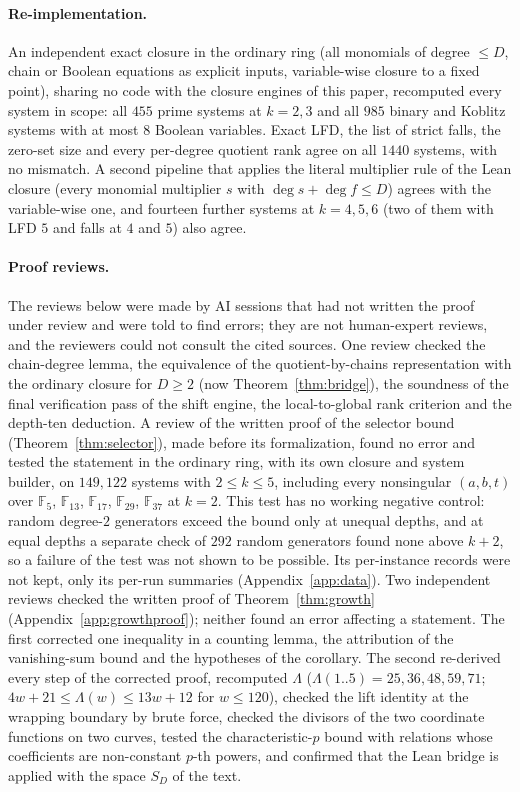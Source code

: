 \documentclass[11pt]{article}
\theoremstyle{definition}\newtheorem{definition}[theorem]{Definition}
\theoremstyle{remark}\newtheorem{remark}[theorem]{Remark}
\newcommand{\F}{\mathbb F}
\begin{document}
\paragraph{Re-implementation.} An independent exact closure in the
ordinary ring (all monomials of degree $\le D$, chain or Boolean equations
as explicit inputs, variable-wise closure to a fixed point), sharing no code
with the closure engines of this paper, recomputed every system in scope: all $455$ prime systems at $k=2,3$ and all $985$
binary and Koblitz systems with at most $8$ Boolean variables. Exact LFD,
the list of strict falls, the zero-set size and every per-degree quotient
rank agree on all $1440$ systems, with no mismatch. A second pipeline that
applies the literal multiplier rule of the Lean closure (every monomial
multiplier $s$ with $\deg s+\deg f\le D$) agrees with the variable-wise one,
and fourteen further systems at $k=4,5,6$ (two of them with LFD $5$ and
falls at $4$ and $5$) also agree.

\paragraph{Proof reviews.} The reviews below were made by AI sessions that
had not written the proof under review and were told to find errors; they are
not human-expert reviews, and the reviewers could not consult the cited
sources. One review checked the chain-degree lemma, the equivalence of the
quotient-by-chains representation with the ordinary closure for $D\ge2$ (now
Theorem~\ref{thm:bridge}), the soundness of the final verification pass of the
shift engine, the local-to-global rank criterion and the depth-ten deduction.
A review of the written proof of the selector bound
(Theorem~\ref{thm:selector}), made before its formalization, found no error
and tested the statement in the ordinary ring, with its own closure and system
builder, on $149{,}122$ systems with $2\le k\le5$, including every nonsingular
$(a,b,t)$ over $\F_5$, $\F_{13}$, $\F_{17}$, $\F_{29}$, $\F_{37}$ at $k=2$.
This test has no working negative control: random degree-$2$ generators exceed
the bound only at unequal depths, and at equal depths a separate check of
$292$ random generators found none above $k+2$, so a failure of the test was
not shown to be possible. Its per-instance records were not kept, only its
per-run summaries (Appendix~\ref{app:data}). Two independent reviews checked
the written proof of Theorem~\ref{thm:growth}
(Appendix~\ref{app:growthproof}); neither found an error affecting a
statement. The first corrected one inequality in a counting lemma, the
attribution of the vanishing-sum bound and the hypotheses of the corollary.
The second re-derived every step of the corrected proof,
recomputed $\Lambda$ ($\Lambda(1..5)=25,36,48,59,71$; $4w+21\le
\Lambda(w)\le13w+12$ for $w\le120$), checked the lift identity at the
wrapping boundary by brute force, checked the divisors of the two
coordinate functions on two curves, tested the characteristic-$p$ bound
with relations whose coefficients are non-constant $p$-th powers, and
confirmed that the Lean bridge is applied with the space $S_D$ of the text.
\end{document}

